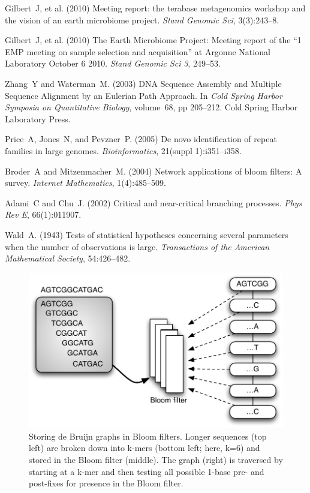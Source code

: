 \documentclass{pnastwo}
\begin{document}
\begin{article}
\begin{thebibliography}{10}
 Gilbert~J, et al. (2010) Meeting report: the terabase 
metagenomics workshop and the vision of an earth microbiome project. {\it 
Stand Genomic Sci}, 3(3):243--8.

 Gilbert~J, et al. (2010) The Earth Microbiome Project: 
Meeting report of the ``1 EMP meeting on sample selection and acquisition'' 
at Argonne National Laboratory October 6 2010. {\it Stand Genomic Sci} 
\emph{3}, 249--53.

 Zhang~Y and Waterman~M. (2003) DNA Sequence Assembly 
and Multiple Sequence Alignment by an Eulerian Path Approach. In {\it Cold 
Spring Harbor Symposia on Quantitative Biology}, volume~68, pp 205--212. 
Cold Spring Harbor Laboratory Press.

 Price~A, Jones~N, and Pevzner~P. (2005) De novo 
identification of repeat families in large genomes. {\it Bioinformatics}, 
21(suppl 1):i351--i358.

Broder~A and Mitzenmacher~M. (2004) Network applications of bloom filters: 
A survey. {\it Internet Mathematics}, 1(4):485--509.

 Adami~C and Chu~J. (2002) Critical and 
near-critical branching processes. {\it Phys Rev E}, 66(1):011907.

 Wald~A. (1943) Tests of statistical hypotheses concerning 
several parameters when the number of observations is large. {\it Transactions 
of the American Mathematical Society}, 54:426--482.

\end{thebibliography}

\end{article}

\begin{figure}
\centering
\includegraphics[width=5in]{bloomgraph}
\caption{Storing de Bruijn graphs in Bloom filters.  Longer sequences (top left) are broken down into k-mers (bottom left; here, k=6) and stored in the Bloom filter (middle).
The graph (right) is traversed by starting at a k-mer and then testing all possible 1-base pre- and post-fixes for presence in the Bloom filter.}

\label{fig:bloomgraph}
\end{figure}
\end{document}
